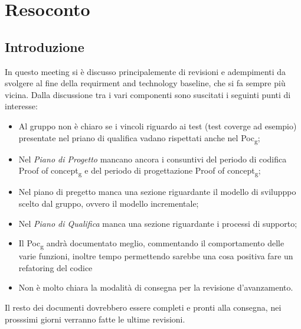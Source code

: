\section{Resoconto}
\subsection{Introduzione}
In questo meeting si è discusso principalemente di revisioni e adempimenti da svolgere al fine della requirment and technology baseline, che si fa sempre più vicina. Dalla discussione tra i vari componenti sono suscitati i seguinti punti di interesse:

\begin{itemize}
\item Al gruppo non è chiaro se i vincoli riguardo ai test (test coverge ad esempio) presentate nel priano di qualifica vadano rispettati anche nel Poc\textsubscript{g};
\item Nel \textit{Piano di Progetto} mancano ancora i consuntivi del periodo di codifica Proof of concept\textsubscript{g} e del periodo di progettazione Proof of concept\textsubscript{g};
\item Nel piano di pregetto manca una sezione riguardante il modello di svilupppo scelto dal gruppo, ovvero il modello incrementale;
\item Nel \textit{Piano di Qualifica} manca una sezione riguardante i processi di supporto;
\item Il Poc\textsubscript{g} andrà documentato meglio, commentando il comportamento delle varie funzioni, inoltre tempo permettendo sarebbe una cosa positiva fare un refatoring del codice
\item Non è molto chiara la modalità di consegna per la revisione d'avanzamento.
\end{itemize}

Il resto dei documenti dovrebbero essere completi e pronti alla consegna, nei prosssimi giorni verranno fatte le ultime revisioni.

